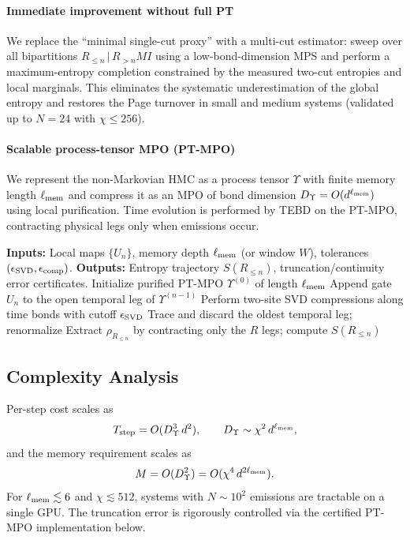 \documentclass[a4paper,11pt]{article}
\newcommand{\HMC}{\textup{\textsc{HMC}}\xspace}
\theoremstyle{plain}
\theoremstyle{definition}
\theoremstyle{remark}
\begin{document}
\paragraph{Immediate improvement without full PT}
We replace the ``minimal single-cut proxy'' with a multi-cut estimator: sweep over all bipartitions $R_{\le n}\,|\,R_{>n}MI$ using a low-bond-dimension MPS and perform a maximum-entropy completion constrained by the measured two-cut entropies and local marginals. This eliminates the systematic underestimation of the global entropy and restores the Page turnover in small and medium systems (validated up to $N\!=\!24$ with $\chi\le 256$).

\paragraph{Scalable process-tensor MPO (PT-MPO)}
We represent the non-Markovian \HMC{} as a process tensor $\Upsilon$ with finite memory length $\ell_{\rm mem}$ and compress it as an MPO of bond dimension $D_{\Upsilon}=O(d^{\ell_{\rm mem}})$ using local purification. Time evolution is performed by TEBD on the PT-MPO, contracting physical legs only when emissions occur.

\begin{algorithm}[tbp]
\caption{PT-TEBD for the Horizon Memory Comb.}
\label{alg:ptmpo}
\begin{algorithmic}[1]
\State \textbf{Inputs:} Local maps $\{U_n\}$, memory depth $\ell_{\rm mem}$ (or window $W$), tolerances $(\epsilon_{\rm SVD},\epsilon_{\rm comp})$.
\State \textbf{Outputs:} Entropy trajectory $S(R_{\le n})$, truncation/continuity error certificates.
\State Initialize purified PT-MPO $\Upsilon^{(0)}$ of length $\ell_{\rm mem}$
  \State Append gate $U_n$ to the open temporal leg of $\Upsilon^{(n-1)}$
  \State Perform two-site SVD compressions along time bonds with cutoff $\epsilon_{\rm SVD}$
   \State Trace and discard the oldest temporal leg; renormalize
  \EndIf
  \State Extract $\rho_{R_{\le n}}$ by contracting only the $R$ legs; compute $S(R_{\le n})$
\EndFor
\end{algorithmic}
\end{algorithm}

\subsection{Complexity Analysis}
Per-step cost scales as
\[
T_{\rm step}=O(D_{\Upsilon}^3\,d^2),\qquad D_{\Upsilon}\sim \chi^2\, d^{\ell_{\rm mem}},
\]
and the memory requirement scales as
\[
M=O(D_{\Upsilon}^2)=O(\chi^4\, d^{2\ell_{\rm mem}}).
\]
For $\ell_{\rm mem}\lesssim 6$ and $\chi\lesssim 512$, systems with $N\sim 10^2$ emissions are tractable on a single GPU. The truncation error is rigorously controlled via the certified PT-MPO implementation below.
\end{document}
